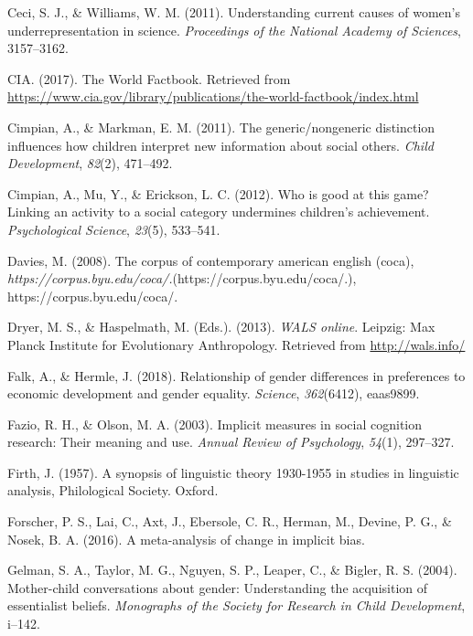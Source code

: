 \documentclass[man,floatsintext]{apa6}
\begin{document}
\leavevmode\hypertarget{ref-ceci2011understanding}{}%
Ceci, S. J., \& Williams, W. M. (2011). Understanding current causes of women's underrepresentation in science. \emph{Proceedings of the National Academy of Sciences}, 3157--3162.

\leavevmode\hypertarget{ref-ciafactbook}{}%
CIA. (2017). The World Factbook. Retrieved from \url{https://www.cia.gov/library/publications/the-world-factbook/index.html}

\leavevmode\hypertarget{ref-cimpian2011generic}{}%
Cimpian, A., \& Markman, E. M. (2011). The generic/nongeneric distinction influences how children interpret new information about social others. \emph{Child Development}, \emph{82}(2), 471--492.

\leavevmode\hypertarget{ref-cimpian2012good}{}%
Cimpian, A., Mu, Y., \& Erickson, L. C. (2012). Who is good at this game? Linking an activity to a social category undermines children's achievement. \emph{Psychological Science}, \emph{23}(5), 533--541.

\leavevmode\hypertarget{ref-davies2008corpus}{}%
Davies, M. (2008). The corpus of contemporary american english (coca), \emph{https://corpus.byu.edu/coca/.}(https://corpus.byu.edu/coca/.), https://corpus.byu.edu/coca/.

\leavevmode\hypertarget{ref-wals}{}%
Dryer, M. S., \& Haspelmath, M. (Eds.). (2013). \emph{WALS online}. Leipzig: Max Planck Institute for Evolutionary Anthropology. Retrieved from \url{http://wals.info/}

\leavevmode\hypertarget{ref-falk2018relationship}{}%
Falk, A., \& Hermle, J. (2018). Relationship of gender differences in preferences to economic development and gender equality. \emph{Science}, \emph{362}(6412), eaas9899.

\leavevmode\hypertarget{ref-fazio2003implicit}{}%
Fazio, R. H., \& Olson, M. A. (2003). Implicit measures in social cognition research: Their meaning and use. \emph{Annual Review of Psychology}, \emph{54}(1), 297--327.

\leavevmode\hypertarget{ref-firth1957synopsis}{}%
Firth, J. (1957). A synopsis of linguistic theory 1930-1955 in studies in linguistic analysis, Philological Society. Oxford.

\leavevmode\hypertarget{ref-forscher2016meta}{}%
Forscher, P. S., Lai, C., Axt, J., Ebersole, C. R., Herman, M., Devine, P. G., \& Nosek, B. A. (2016). A meta-analysis of change in implicit bias.

\leavevmode\hypertarget{ref-gelman2004mother}{}%
Gelman, S. A., Taylor, M. G., Nguyen, S. P., Leaper, C., \& Bigler, R. S. (2004). Mother-child conversations about gender: Understanding the acquisition of essentialist beliefs. \emph{Monographs of the Society for Research in Child Development}, i--142.
\end{document}
